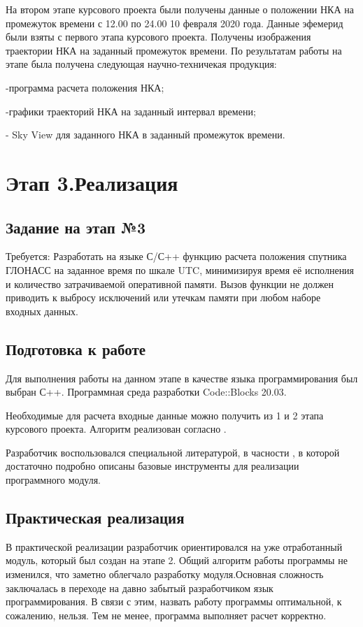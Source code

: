 \documentclass[]{article}
\begin{document}
	На втором этапе курсового проекта были получены данные о положении НКА на промежуток времени с 12.00 по 24.00 10 февраля 2020 года. Данные эфемерид были взяты с первого этапа курсового проекта. Получены изображения траектории НКА на заданный промежуток времени. По результатам работы на этапе была получена следующая научно-техничекая продукция:
	
	-программа расчета положения НКА;
	
	-графики траекторий НКА на заданный интервал времени;
	
	- Sky View для заданного НКА в заданный промежуток времени.

\newpage	
\section{Этап 3.Реализация}
\subsection{Задание на этап №3}
Требуется:
Разработать на языке С/С++ функцию расчета положения спутника ГЛОНАСС на заданное время по шкале UTC, минимизируя время её исполнения и количество затрачиваемой оперативной памяти. Вызов функции не должен приводить к выбросу исключений или утечкам памяти при любом наборе входных данных.


\subsection{Подготовка к работе}
Для выполнения работы на данном этапе в качестве языка программирования был выбран С++. Программная среда разработки Code::Blocks 20.03. 

Необходимые для расчета входные данные можно получить из 1 и 2 этапа курсового проекта. Алгоритм реализован согласно \cite{ICD}. 

Разработчик воспользовался специальной литературой, в часности \cite{alex}, в которой достаточно подробно описаны базовые инструменты для реализации программного модуля. 
\subsection{Практическая реализация}

В практической реализации разработчик ориентировался на уже отработанный модуль, который был создан на этапе 2. Общий алгоритм работы программы не изменился, что заметно облегчало разработку модуля.Основная сложность заключалась в переходе на давно забытый разработчиком язык программирования. В связи с этим, назвать работу программы оптимальной, к сожалению, нельзя. Тем не менее, программа выполняет расчет корректно.
\end{document}
